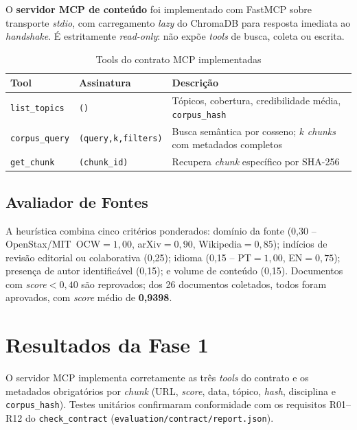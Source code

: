 \documentclass[12pt]{article}
\begin{document}
O \textbf{servidor MCP de conteúdo} foi implementado com FastMCP \cite{fastmcp} sobre transporte
\textit{stdio}, com carregamento \textit{lazy} do ChromaDB para resposta imediata ao
\textit{handshake}. É estritamente \textit{read-only}: não expõe \textit{tools} de busca, coleta
ou escrita.

\begin{table}[h]
\centering
\caption{Tools do contrato MCP implementadas}
\label{tab:tools}
\small
\begin{tabularx}{\linewidth}{l l X}
\toprule
\textbf{Tool} & \textbf{Assinatura} & \textbf{Descrição} \\
\midrule
\texttt{list\_topics} & \texttt{()} & Tópicos, cobertura, credibilidade média, \texttt{corpus\_hash} \\
\texttt{corpus\_query} & \texttt{(query,k,filters)} & Busca semântica por cosseno; $k$ \textit{chunks} com metadados completos \\
\texttt{get\_chunk} & \texttt{(chunk\_id)} & Recupera \textit{chunk} específico por SHA-256 \\
\bottomrule
\end{tabularx}
\end{table}

\subsection{Avaliador de Fontes}

A heurística combina cinco critérios ponderados: domínio da fonte (0,30 -- OpenStax/MIT~OCW$=1{,}00$,
arXiv$=0{,}90$, Wikipedia$=0{,}85$); indícios de revisão editorial ou colaborativa (0,25); idioma
(0,15 -- PT$=1{,}00$, EN$=0{,}75$); presença de autor identificável (0,15); e volume de conteúdo
(0,15). Documentos com \textit{score}${}<0{,}40$ são reprovados; dos 26 documentos coletados,
todos foram aprovados, com \textit{score} médio de \textbf{0,9398}.

\section{Resultados da Fase 1}

O servidor MCP implementa corretamente as três \textit{tools} do contrato e os metadados
obrigatórios por \textit{chunk} (URL, \textit{score}, data, tópico, \textit{hash}, disciplina e
\texttt{corpus\_hash}). Testes unitários confirmaram conformidade com os requisitos R01--R12 do
\texttt{check\_contract} (\texttt{evaluation/contract/report.json}).
\end{document}
